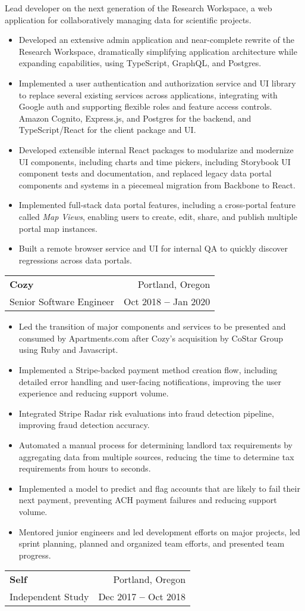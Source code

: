 \documentclass[letterpaper,11pt]{article}
\makeatletter
\newcommand{\resumeItem}[1]{
  \item\small{
    {#1 \vspace{-2pt}}
  }
}
\newcommand{\resumeSubheading}[4]{
  \item
    \begin{tabular*}{0.97\textwidth}[t]{l@{\extracolsep{\fill}}r}
      \normalsize \textbf{#1} & \small#2 \\
      \small #3 & \small #4 \\
    \end{tabular*}\vspace{-9pt}
}
\newcommand{\resumeItemListStart}{\begin{itemize}}
\newcommand{\resumeItemListEnd}{\end{itemize}\vspace{-5pt}}
\newcommand{\resumeSectionBody}[1]{
  \vspace{0.7em}
  \small #1
  \vspace{-5pt}
}
\makeatother
\begin{document}
      \resumeSectionBody{
        Lead developer on the next generation of the Research Workspace, a web application for collaboratively managing data for scientific projects.
      }
      \resumeItemListStart
        \resumeItem{Developed an extensive admin application and near-complete rewrite of the Research Workspace, dramatically simplifying application architecture while expanding capabilities, using TypeScript, GraphQL, and Postgres.}
        \resumeItem{Implemented a user authentication and authorization service and UI library to replace several existing services across applications, integrating with Google auth and supporting flexible roles and feature access controls. Amazon Cognito, Express.js, and Postgres for the backend, and TypeScript/React for the client package and UI.}
        \resumeItem{Developed extensible internal React packages to modularize and modernize UI components, including charts and time pickers, including Storybook UI component tests and documentation, and replaced legacy data portal components and systems in a piecemeal migration from Backbone to React.}
        \resumeItem{Implemented full-stack data portal features, including a cross-portal feature called \textit{Map Views}, enabling users to create, edit, share, and publish multiple portal map instances.}
        \resumeItem{Built a remote browser service and UI for internal QA to quickly discover regressions across data portals.}
      \resumeItemListEnd
    \resumeSubheading
      {Cozy}{Portland, Oregon}
      {Senior Software Engineer}{Oct 2018 \textbf{--} Jan 2020}

        \resumeItemListStart
          \resumeItem{Led the transition of major components and services to be presented and consumed by Apartments.com after Cozy's acquisition by CoStar Group using Ruby and Javascript.}
          \resumeItem{Implemented a Stripe-backed payment method creation flow, including detailed error handling and user-facing notifications, improving the user experience and reducing support volume.}
          \resumeItem{Integrated Stripe Radar risk evaluations into fraud detection pipeline, improving fraud detection accuracy.}
          \resumeItem{Automated a manual process for determining landlord tax requirements by aggregating data from multiple sources, reducing the time to determine tax requirements from hours to seconds.}
          \resumeItem{Implemented a model to predict and flag accounts that are likely to fail their next payment, preventing ACH payment failures and reducing support volume.}
          \resumeItem{Mentored junior engineers and led development efforts on major projects, led sprint planning, planned and organized team efforts, and presented team progress.}
        \resumeItemListEnd
    \resumeSubheading
      {Self}{Portland, Oregon}
      {Independent Study}{Dec 2017 \textbf{--} Oct 2018}
\end{document}
